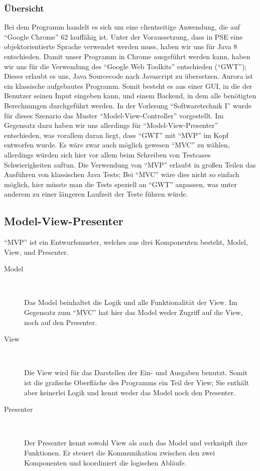 \documentclass[parskip=full,11pt,twoside]{scrbook}
\begin{document}
\subsubsection{Übersicht}
Bei dem Programm handelt es sich um eine clientseitige Anwendung, die auf \enquote{Google Chrome} 62 lauffähig ist.
Unter der Voraussetzung, dass in PSE eine objektorientierte Sprache verwendet werden muss, haben wir uns für Java 8 entschieden.
Damit unser Programm in Chrome ausgeführt werden kann, haben wir uns für die Verwendung des \enquote{Google Web Toolkits} entschieden (\enquote{GWT});
Dieses erlaubt es uns, Java Sourcecode nach Javascript zu übersetzen.
\newline
Aurora ist ein klassische aufgebautes Programm.
Somit besteht es aus einer GUI, in die der Benutzer seinen Input eingeben kann, und einem Backend, in dem alle benötigten Berechnungen durchgeführt werden. 
In der Vorlesung \enquote{Softwaretechnik I} wurde für dieses Szenario das Muster \enquote{Model-View-Controller} vorgestellt.
Im Gegensatz dazu haben wir uns allerdings für \enquote{Model-View-Presenter} entschieden, was vorallem daran liegt, dass \enquote{GWT} mit \enquote{MVP} im Kopf entworfen wurde.
Es wäre  zwar auch möglich gewesen \enquote{MVC} zu wählen, allerdings würden sich hier vor allem beim Schreiben von Testcases Schwierigkeiten auftun.
Die Verwendung von \enquote{MVP} erlaubt in großen Teilen das Ausführen von klassischen Java Tests;
Bei \enquote{MVC} wäre dies nicht so einfach möglich, hier müsste man die Tests speziell an \enquote{GWT} anpassen, was unter anderem zu einer längeren Laufzeit der Teste führen würde.

\subsection{Model-View-Presenter}
\enquote{MVP} ist ein Entwurfsmuster, welches aus drei Komponenten besteht, Model, View, und Presenter.
\begin{description}
	\item[Model] ~\par
	Das Model beinhaltet die Logik und alle Funktionalität der View.
    Im Gegensatz zum \enquote{MVC} hat hier das Model weder Zugriff auf die View, noch auf den Presenter.

	\item[View] ~\par
	Die View wird für das Darstellen der Ein- und Ausgaben benutzt.
    Somit ist die grafische Oberfläche des Programms ein Teil der View;
    Sie enthält aber keinerlei Logik und kennt weder das Model noch den Presenter.
	
	\item[Presenter] ~\par
	Der Presenter kennt sowohl View als auch das Model und verknüpft ihre Funktionen.
    Er steuert die Kommunikation zwischen den zwei Komponenten und koordiniert die logischen Abläufe.
\end{description}
\end{document}
